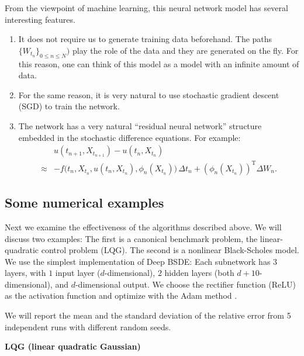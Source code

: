 \documentclass[12pt,AutoFakeBold,AutoFakeSlant]{article}
\theoremstyle{definition}
\newcommand{\transpose}{^{\operatorname{T}}}
\begin{document}
	From the viewpoint of machine learning, this  neural network model has several interesting features.
	\begin{enumerate}
	\item It does not require us to generate training data beforehand.  The paths  $ \{ W_{ t_n } \}_{ 0 \leq n \leq N } )$ play
	the role of the data and they are generated on the fly.  For this reason, one can think of this model as a model with an infinite amount of data.
	\item For the same reason,  it is very natural to use stochastic gradient descent (SGD) to train the network.
	\item The network has a very natural ``residual neural network'' structure embedded in the stochastic difference equations.
	For example:
	\begin{equation}
	\begin{split}
	& u( t_{ n + 1 },X_{t_{n+1}}) - u( t_{ n },X_{t_{n}}) \\
	\approx  & - f\big(t_n, X_{ t_n }, u( t_{ n },X_{t_{n}}),
		\phi_n(X_{t_n})
	\big)\,\Delta t_n+ (\phi_n(X_{t_n}))\transpose
		\Delta W_n.
	\end{split}
	\end{equation}
	\end{enumerate}

	\subsection{Some numerical examples}

	Next we examine the effectiveness of the algorithms described above.  We will discuss two examples:
	The first is a canonical benchmark problem, the linear-quadratic control problem (LQG).  The second is a nonlinear Black-Scholes model.
	We use the simplest implementation of Deep BSDE:  Each subnetwork has $ 3 $ layers, with $ 1 $ input layer ($ d $-dimensional), $ 2 $ hidden layers (both $ d+10 $-dimensional), and $d$-dimensional output.
	We choose the rectifier function (ReLU) as the activation function and optimize with the Adam method \cite{Kingma2015Adam}.

	We will report the mean and the standard deviation of the relative error from  5 independent runs  with different random seeds.

	\vspace{.1in}
	\noindent
	{\bf LQG (linear quadratic Gaussian)}
\end{document}
